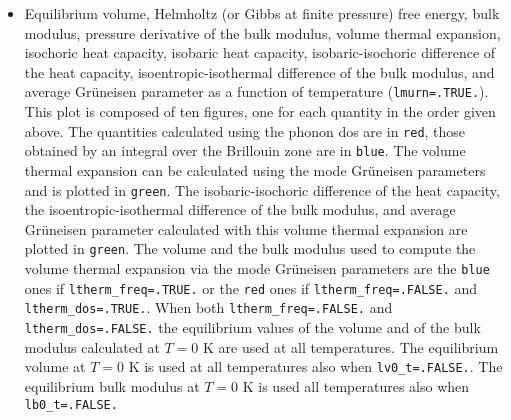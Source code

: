 \documentclass[12pt,a4paper]{article}
\begin{document}
\begin{itemize}
\item
Equilibrium volume, Helmholtz (or Gibbs at finite pressure) free energy, 
bulk modulus, pressure derivative of the bulk
modulus, volume thermal expansion, isochoric heat capacity, 
isobaric heat capacity, isobaric-isochoric difference of the heat capacity,    
isoentropic-isothermal difference of the bulk modulus, and 
average Gr\"uneisen parameter as a function of temperature 
(\texttt{lmurn=.TRUE.}). 
This plot is composed of ten figures, one for each 
quantity in the order given above. The quantities 
calculated using the phonon dos are in \texttt{red}, those
obtained by an integral over the Brillouin zone are in \texttt{blue}.
The volume thermal expansion can be calculated using the mode Gr\"uneisen 
parameters and is plotted in \texttt{green}. 
The isobaric-isochoric difference of the heat capacity, the
isoentropic-isothermal difference of the bulk modulus, and
average Gr\"uneisen parameter calculated with this volume thermal expansion 
are plotted in \texttt{green}. The volume and the bulk modulus used to
compute the volume thermal expansion via the mode Gr\"uneisen parameters
are the \texttt{blue} ones if \texttt{ltherm\_freq=.TRUE.}
or the \texttt{red} ones if \texttt{ltherm\_freq=.FALSE.} and 
\texttt{ltherm\_dos=.TRUE.}.
When both \texttt{ltherm\_freq=.FALSE.} and \texttt{ltherm\_dos=.FALSE.}
the equilibrium values of the volume and of the bulk modulus calculated 
at $T=0$ K are used at all temperatures.
The equilibrium volume at $T=0$ K is used at all temperatures also when
\texttt{lv0\_t=.FALSE.}.
The equilibrium bulk modulus at $T=0$ K is used all temperatures also
when \texttt{lb0\_t=.FALSE.}


\end{itemize}
\end{document}
